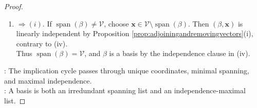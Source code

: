 \begin{theorem}
\begin{proof}
\begin{enumerate}[label=(\roman*)]
\item[$(iv)$] $\Rightarrow (i)$. If $\operatorname{span}(\beta)\neq\mathcal{V}$, choose $\mathbf{x}\in\mathcal{V}\setminus\operatorname{span}(\beta)$. Then $(\beta,\mathbf{x})$ is linearly independent by Proposition \ref{prop:adjoiningandremovingvectors}(i), contrary to (iv).\\
Thus $\operatorname{span}(\beta)=\mathcal{V}$, and $\beta$ is a basis by the independence clause in (iv).
\end{enumerate}
: The implication cycle passes through unique coordinates, minimal spanning, and maximal independence.\\
: A basis is both an irredundant spanning list and an independence-maximal list.
\end{proof}
\end{theorem}

